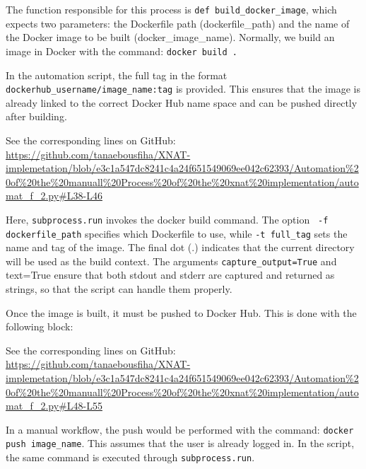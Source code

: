 The function responsible for this process is \texttt{def build\_docker\_image}, which expects two parameters: the Dockerfile path (dockerfile\_path) and the name of the Docker image to be built (docker\_image\_name). Normally, we build an image in Docker with the command: \texttt{docker build .}


In the automation script, the full tag in the format \texttt{dockerhub\_username/image\_name:tag} is provided. This ensures that the image is already linked to the correct Docker Hub name space and can be pushed directly after building.




\noindent\footnotesize See the corresponding lines on GitHub:\url{ https://github.com/tanaebousfiha/XNAT-implemetation/blob/e3c1a547dc8241c4a24f651549069ee042c62393/Automation%20of%20the%20manuall%20Process%20of%20the%20xnat%20implementation/automat_f_2.py#L38-L46}







Here, \texttt{subprocess.run} invokes the docker build command. The option \texttt{ -f dockerfile\_path} specifies which Dockerfile to use, while \texttt{-t full\_tag} sets the name and tag of the image. The final dot (.) indicates that the current directory will be used as the build context. The arguments \texttt{capture\_output=True} and text=True ensure that both stdout and stderr are captured and returned as strings, so that the script can handle them properly.

Once the image is built, it must be pushed to Docker Hub. This is done with the following block:


\noindent\footnotesize See the corresponding lines on GitHub:\url{ https://github.com/tanaebousfiha/XNAT-implemetation/blob/e3c1a547dc8241c4a24f651549069ee042c62393/Automation%20of%20the%20manuall%20Process%20of%20the%20xnat%20implementation/automat_f_2.py#L48-L55}





In a manual workflow, the push would be performed with the command:  \texttt{docker push image\_name}. This assumes that the user is already logged in. In the script, the same command is executed through  \texttt{subprocess.run}.


